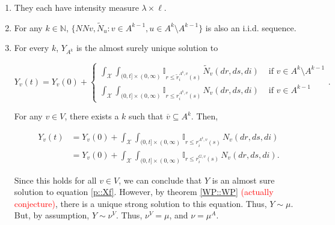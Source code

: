 \documentclass[12pt]{article}
\newcommand{\mb}{\mathbb}
\newcommand{\mc}{\mathcal}
\newcommand{\ov}{\overline}
\newcommand{\te}{\text}
\newcommand{\tr}{\textcolor{red}}
\newcommand{\sta}{\mc{X}}							%
\newcommand{\cl}[1]{\ov{#1}}						%
\newcommand{\indx}[1]{^{#1}}						%
\newcommand{\Xf}{X}									%
\newcommand{\poiss}{N}								%
\newcommand{\leb}{\lambda}							%
\newcommand{\Sm}{\ell}								%
\newcommand{\rate}{r}								%
\newcommand{\m}{\mu}								%
\newcommand{\poissv}[1]{_{#1}}						%
\newcommand{\vind}[1]{_{#1}}						%
\newcommand{\tme}[1]{(#1)}							%
\newcommand{\vpara}[1]{^{#1}}						%
\newcommand{\stpara}[1]{_{#1}}						%
\newcommand{\gvpara}[2]{^{#1,#2}}					%
\newcommand{\Xg}{Y}									%
\newcommand{\brate}{\alt{\rate}}					%
\newcommand{\alt}[1]{\tilde{#1}}					%
\newcommand{\mm}{\nu}								%
\begin{document}
\begin{enumerate}
\item They each have intensity measure \(\leb\times\Sm\).

\item For any \(k \in \mb{N}\), \(\{\poiss\poiss{v},\alt{\poiss}\poissv{u}: v \in A\indx{k-1},u\in A\indx{k}\setminus A\indx{k-1}\}\) is also an i.i.d. sequence.

\item For every \(k\), \(\Xg\vind{A\indx{k}}\) is the almost surely unique solution to 

\begin{equation}
\Xg\vind{v}\tme{t} = \Xg\vind{v}\tme{0} + 
\begin{cases}
\int_\sta\int_{(0,t]\times(0,\infty)} \mb{I}_{r \leq \brate\gvpara{A\indx{k}}{v}\stpara{i}\tme{s}}\,\alt{\poiss}\poissv{v}(dr,ds,di)& \te{ if } v \in A\indx{k}\setminus A\indx{k-1}\\
\int_\sta\int_{(0,t]\times(0,\infty)} \mb{I}_{r \leq \rate\gvpara{A\indx{k}}{v}\stpara{i}\tme{s}}\,\poiss\poissv{v}(dr,ds,di)&\te{ if } v \in A\indx{k-1}
\end{cases}.
\label{Uq::extcomb}
\end{equation}

For any \(v \in V\), there exists a \(k\) such that \(\cl{v}\subseteq A\indx{k}\). Then,

\begin{align*}
\Xg\vind{v}\tme{t} &= \Xg\vind{v}\tme{0} + \int_\sta\int_{(0,t]\times(0,\infty)} \mb{I}_{r \leq \rate\gvpara{A\indx{k}}{v}\stpara{i}\tme{s}}\,\poiss\poissv{v}(dr,ds,di)\\
&=\Xg\vind{v}\tme{0} + \int_\sta\int_{(0,t]\times(0,\infty)} \mb{I}_{r \leq \rate\gvpara{G}{v}\stpara{i}\tme{s}}\,\poiss\poissv{v}(dr,ds,di).
\end{align*}

Since this holds for all \(v \in V\), we can conclude that \(\Xg\) is an almost sure solution to equation \eqref{p::Xf}. However, by theorem \ref{WP::WP} \tr{(actually conjecture)}, there is a unique strong solution to this equation. Thus, \(\Xg \sim \m\). But, by assumption, \(\Xg\sim \mm\vpara{V}\). Thus, \(\mm\vpara{V} = \m\), and \(\mm = \m\vpara{A}\).
\end{enumerate}

\newpage


\end{document}
